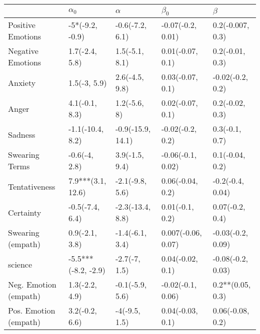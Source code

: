 \begin{tabular}{lllll}
\toprule
{} &           $\alpha_0$ &           $\alpha$ &           $\beta_0$ &            $\beta$ \\
\midrule
Positive Emotions     &      -5*(-9.2, -0.9) &    -0.6(-7.2, 6.1) &   -0.07(-0.2, 0.01) &   0.2(-0.007, 0.3) \\
Negative Emotions     &       1.7(-2.4, 5.8) &     1.5(-5.1, 8.1) &    0.01(-0.07, 0.1) &    0.2(-0.01, 0.3) \\
Anxiety               &         1.5(-3, 5.9) &     2.6(-4.5, 9.8) &    0.03(-0.07, 0.1) &   -0.02(-0.2, 0.2) \\
Anger                 &       4.1(-0.1, 8.3) &       1.2(-5.6, 8) &    0.02(-0.07, 0.1) &    0.2(-0.02, 0.3) \\
Sadness               &     -1.1(-10.4, 8.2) &  -0.9(-15.9, 14.1) &    -0.02(-0.2, 0.2) &     0.3(-0.1, 0.7) \\
Swearing Terms        &        -0.6(-4, 2.8) &     3.9(-1.5, 9.4) &   -0.06(-0.1, 0.02) &    0.1(-0.04, 0.2) \\
Tentativeness         &    7.9***(3.1, 12.6) &    -2.1(-9.8, 5.6) &    0.06(-0.04, 0.2) &   -0.2(-0.4, 0.04) \\
Certainty             &      -0.5(-7.4, 6.4) &   -2.3(-13.4, 8.8) &     0.01(-0.1, 0.2) &    0.07(-0.2, 0.4) \\
Swearing (empath)     &       0.9(-2.1, 3.8) &    -1.4(-6.1, 3.4) &  0.007(-0.06, 0.07) &  -0.03(-0.2, 0.09) \\
science               &  -5.5***(-8.2, -2.9) &      -2.7(-7, 1.5) &    0.04(-0.02, 0.1) &  -0.08(-0.2, 0.03) \\
Neg. Emotion (empath) &       1.3(-2.2, 4.9) &    -0.1(-5.9, 5.6) &   -0.02(-0.1, 0.06) &   0.2**(0.05, 0.3) \\
Pos. Emotion (empath) &       3.2(-0.2, 6.6) &      -4(-9.5, 1.5) &    0.04(-0.03, 0.1) &   0.06(-0.08, 0.2) \\
\bottomrule
\end{tabular}
